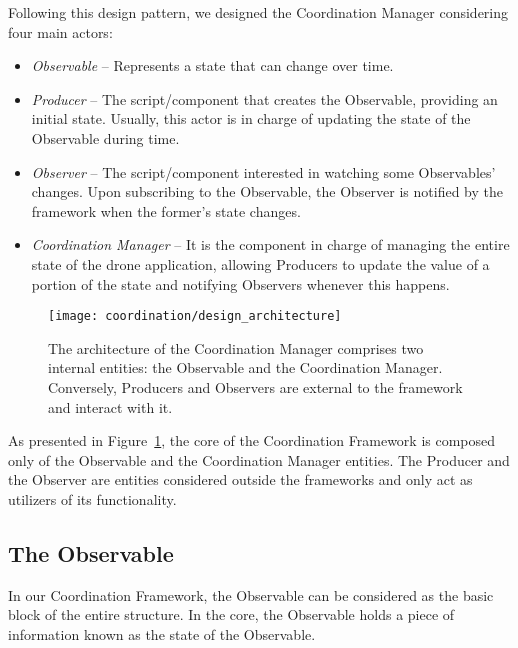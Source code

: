 Following this design pattern, we designed the Coordination Manager considering four main actors:
\begin{itemize}
    \item \textit{Observable} -- Represents a state that can change over time.  
    
    \item \textit{Producer} -- The script/component that creates the Observable, providing an initial state. 
    Usually, this actor is in charge of updating the state of the Observable during time.

    \item \textit{Observer} -- The script/component interested in watching some Observables' changes. 
    Upon subscribing to the Observable, the Observer is notified by the framework when the former's state changes.

    \item \textit{Coordination Manager} -- It is the component in charge of managing the entire state of the drone application, allowing Producers to update the value of a portion of the state and notifying Observers whenever this happens.
\end{itemize}


\begin{figure}[tb]
    \centering
    \texttt{[image: coordination/design\_architecture]}
    \caption[The architecture of the Coordination Framework]{The architecture of the Coordination Manager comprises two internal entities: the Observable and the Coordination Manager. 
    Conversely, Producers and Observers are external to the framework and interact with it. }\label{fig:coordination_design_architecture}
\end{figure}

As presented in Figure~\ref{fig:coordination_design_architecture}, the core of the Coordination Framework is composed only of the Observable and the Coordination Manager entities.
The Producer and the Observer are entities considered outside the frameworks and only act as utilizers of its functionality.

\subsection{The Observable}\label{subsec:observable}
In our Coordination Framework, the Observable can be considered as the basic block of the entire structure.
In the core, the Observable holds a piece of information known as the state of the Observable. 

